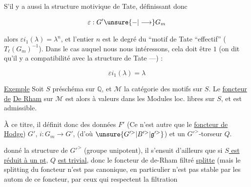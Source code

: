
S'il y a aussi la structure motivique de Tate, définissant donc

\[
\varepsilon:G'\unsure{-|\longrightarrow}G_m
\]

alors $\varepsilon i_1(\lambda)=\lambda^n$, et l'entier $n$ est le degré du  ``motif de Tate ``effectif'' ( $T_{\ell}(G_m)^{-1}$). Dans le cas auquel nous nous intéressons, cela doit être $1$ (on dit qu'il y a compatibilité avec la structure de Tate ---) :

\[
\varepsilon i_1(\lambda)=\lambda
\]

\uline{Exemple} Soit $S$ préschéma  sur $\mathbb Q$,  et $\mathcal M$ la catégorie des motifs sur $S$. Le \uline{foncteur de} \uline{De Rham} sur $\mathcal M$ est alors à valeurs dans les Modules loc. libres sur $S$, et est admissible.

À ce titre, il définit donc des données $F'$ (Ce n'est autre que le \uline{foncteur de Hodge})  $G'$, $i:G_m\longrightarrow G'$, (d'où $\unsure{G'^{>}|B'^{>}|\mathfrak g'^{>}}$) et un $G'^{>}$-torseur $Q$.

 donné la structure de $G'^{>}$ (groupe unipotent), il s'ensuit d'ailleurs que si \uline{$S$ est réduit à un pt}, $Q$ \uline{est trivial}, donc le foncteur de de-Rham filtré \uline{splitte} (mais le splitting du foncteur n'est pas canonique, en particulier n'est pas stable par les autom de ce foncteur,  par ceux qui respectent la filtration
